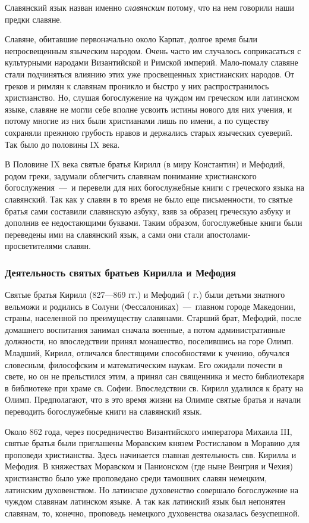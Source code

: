 \documentclass[11pt,a4paper,oneside]{memoir}
\begin{document}
    Славянский язык назван именно \emph{славянским} потому, что на нем говорили наши предки славяне.
    
    Славяне, обитавшие первоначально около Карпат, долгое время были непросвещенным языческим народом. Очень часто им случалось соприкасаться с культурными народами Византийской и Римской империй. Мало-помалу славяне стали подчиняться влиянию этих уже просвещенных христианских народов. От греков и римлян к славянам проникло и быстро у них распространилось христианство. Но, слушая богослужение на чуждом им греческом или латинском языке, славяне не могли себе вполне усвоить истины нового для них учения, и потому многие из них были христианами лишь по имени, а по существу сохраняли прежнюю грубость нравов и держались старых языческих суеверий. Так было до половины IX века.
    
    В Половине IX века святые братья Кирилл (в миру Константин) и Мефодий, родом греки, задумали облегчить славянам понимание христианского богослужения~---~и перевели для них богослужебные книги с греческого языка на славянский. Так как у славян в то время не было еще письменности, то святые братья сами составили славянскую азбуку, взяв за образец греческую азбуку и дополнив ее недостающими буквами. Таким образом, богослужебные книги были переведены ими на славянский язык, а сами они стали апостолами-просветителями славян.
    
                \subsubsection{Деятельность святых братьев Кирилла и Мефодия}

    Святые братья Кирилл (827---869 гг.) и Мефодий ( г.) были детьми знатного вельможи и родились в Солуни (Фессалониках)~---~главном городе Македонии, страны, населенной по преимуществу славянами. Старший брат, Мефодий, после домашнего воспитания занимал сначала военные, а потом административные должности, но впоследствии принял монашество, поселившись на горе Олимп. Младший, Кирилл, отличался блестящими способностями к учению, обучался словесным, философским и математическим наукам. Его ожидали почести в свете, но он не прельстился этим, а принял сан священника и место библиотекаря в библиотеке при храме св. Софии. Впоследствии св. Кирилл удалился к брату на Олимп. Предполагают, что в это время жизни на Олимпе святые братья и начали переводить богослужебные книги на славянский язык.

    Около 862 года, через посредничество Византийского императора Михаила III, святые братья были приглашены Моравским князем Ростиславом в Моравию для проповеди христианства. Здесь начинается главная деятельность свв. Кирилла и Мефодия. В княжествах Моравском и Панионском (где ныне Венгрия и Чехия) христианство было уже проповедано среди тамошних славян немецким, латинским духовенством. Но латинское духовенство совершало богослужение на чуждом славянам латинском языке. А так как латинский язык был непонятен славянам, то, конечно, проповедь немецкого духовенства оказалась безуспешной.
\end{document}
